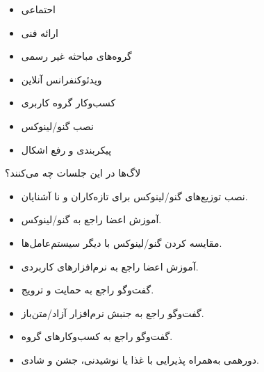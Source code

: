 \begin{itemize}
\item احتماعی

\item ارائه فنی

\item گروه‌های مباحثه غیر رسمی

\item ویدئوکنفرانس آنلاین

\item کسب‌وکار گروه کاربری

\item نصب گنو/لینوکس

\item پیکربندی و رفع اشکال
\end{itemize}

لاگ‌ها در این جلسات چه می‌کنند؟

\begin{itemize}
\item
نصب توزیع‌های گنو/لینوکس برای تازه‌کاران و نا آشنایان.

\item
آموزش اعضا راجع به گنو/لینوکس.

\item
مقایسه کردن گنو/لینوکس با دیگر سیستم‌عامل‌ها.

\item
آموزش اعضا راجع به نرم‌افزارهای کاربردی.

\item
گفت‌وگو راجع به حمایت و ترویج.

\item
گفت‌وگو راجع به جنبش نرم‌افزار آزاد/متن‌باز.

\item
گفت‌وگو راجع به کسب‌وکارهای گروه.

\item
دورهمی به‌همراه پذیرایی با غذا یا نوشیدنی، جشن و شادی.
\end{itemize}

